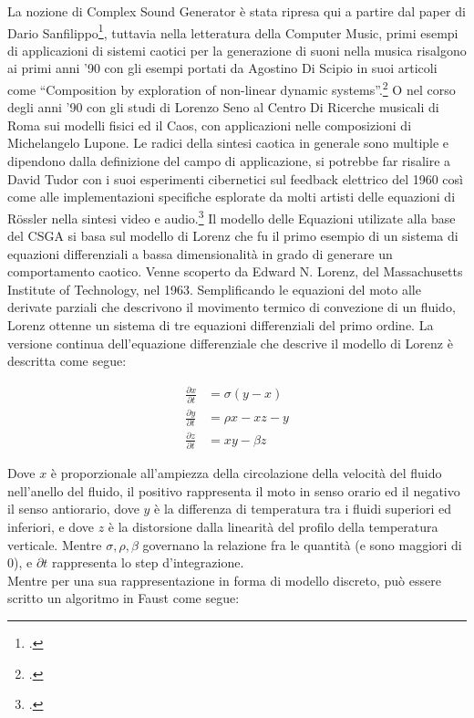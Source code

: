 La nozione di Complex Sound Generator è stata ripresa qui a partire dal
paper di Dario Sanfilippo\footcite{sanfilippo_constrained_2021},
tuttavia nella letteratura della Computer Music, primi esempi di applicazioni
di sistemi caotici per la generazione di suoni nella musica risalgono
ai primi anni '90 con gli esempi portati da Agostino Di Scipio
in suoi articoli come “Composition by exploration of non-linear dynamic systems”.\footcite{discipioiterated}
O nel corso degli anni '90 con gli studi di Lorenzo Seno al Centro Di Ricerche musicali
di Roma sui modelli fisici ed il Caos, con applicazioni nelle composizioni di Michelangelo Lupone.
Le radici della sintesi caotica in generale sono multiple e dipendono
dalla definizione del campo di applicazione, si potrebbe far risalire
a David Tudor con i suoi esperimenti cibernetici sul feedback elettrico del 1960
così come alle implementazioni specifiche esplorate da molti artisti
delle equazioni di Rössler nella sintesi video e audio.\footcite{tom_mudd_gutter_synthesis}
Il modello delle Equazioni utilizate alla base del CSGA si basa sul modello di Lorenz 
che fu il primo esempio di un sistema di equazioni differenziali a bassa
dimensionalità in grado di generare un comportamento caotico.
Venne scoperto da Edward N. Lorenz, del Massachusetts Institute of Technology, nel 1963.
Semplificando le equazioni del moto alle derivate parziali che descrivono il movimento termico di
convezione di un fluido, Lorenz ottenne un sistema di tre equazioni differenziali del primo ordine.
La versione continua dell’equazione differenziale che descrive il modello di Lorenz è descritta come segue: 

\begin{align*}
\frac{\partial x}{\partial t} & = \sigma(y-x) \\
\frac{\partial y}{\partial t} & = \rho x - xz - y \\
\frac{\partial z}{\partial t} & = xy -\beta z 
\end{align*}

Dove \( x \) è proporzionale all’ampiezza della circolazione della velocità del fluido nell’anello del fluido,
il positivo rappresenta il moto in senso orario ed il negativo il senso antiorario,
dove \( y \) è la differenza di temperatura tra i fluidi superiori ed inferiori,
e dove \( z \) è la distorsione dalla linearità del profilo della temperatura verticale.
Mentre \( \sigma,  \rho,  \beta \) governano la relazione fra le quantità (e sono maggiori di 0),
e \( \partial t \) rappresenta lo step d'integrazione. \\
Mentre per una sua rappresentazione in forma di modello discreto,
può essere scritto un algoritmo in Faust come segue:

